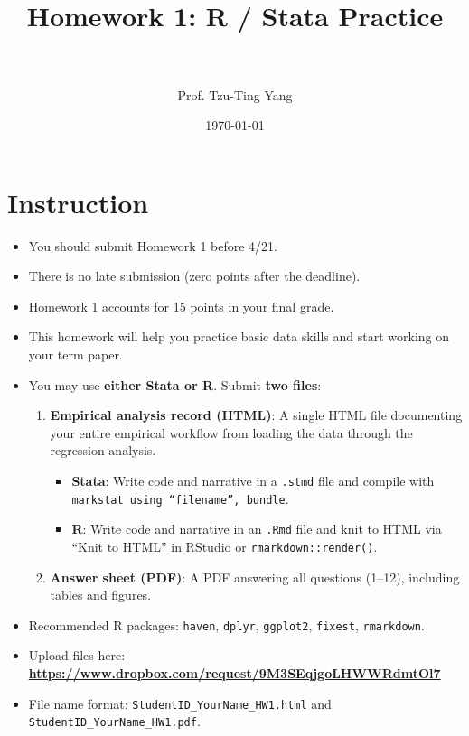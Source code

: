 \documentclass[paper=a4, fontsize=11pt]{scrartcl}
\title{
\normalfont \normalsize
\horrule{0.5pt} \\[0.4cm]
\huge Homework 1: R / Stata Practice \\
\horrule{2pt} \\[0.5cm]
}
\author{Prof. Tzu-Ting Yang}
\date{\normalsize\today}
\begin{document}
\maketitle




\section*{Instruction}

\begin{itemize}
\item[\textbullet] You should submit Homework 1 before 4/21.
\item[\textbullet] There is no late submission (zero points after the deadline).
\item[\textbullet] Homework 1 accounts for 15 points in your final grade.
\item[\textbullet] This homework will help you practice basic data skills and start working on your term paper.
\item[\textbullet] You may use \textbf{either Stata or R}. Submit \textbf{two files}:
  \begin{enumerate}
    \item \textbf{Empirical analysis record (HTML)}: A single HTML file documenting your entire empirical workflow from loading the data through the regression analysis.
    \begin{itemize}
      \item \textbf{Stata}: Write code and narrative in a \texttt{.stmd} file and compile with \texttt{markstat using ``filename'', bundle}.
      \item \textbf{R}: Write code and narrative in an \texttt{.Rmd} file and knit to HTML via ``Knit to HTML'' in RStudio or \texttt{rmarkdown::render()}.
    \end{itemize}
    \item \textbf{Answer sheet (PDF)}: A PDF answering all questions (1--12), including tables and figures.
  \end{enumerate}
\item[\textbullet] Recommended R packages: \texttt{haven}, \texttt{dplyr}, \texttt{ggplot2}, \texttt{fixest}, \texttt{rmarkdown}.
\item[\textbullet] Upload files here: \textbf{\url{https://www.dropbox.com/request/9M3SEqjgoLHWWRdmtOl7}}
\item[\textbullet] File name format: \texttt{StudentID\_YourName\_HW1.html} and \texttt{StudentID\_YourName\_HW1.pdf}.
\end{itemize}
\end{document}
